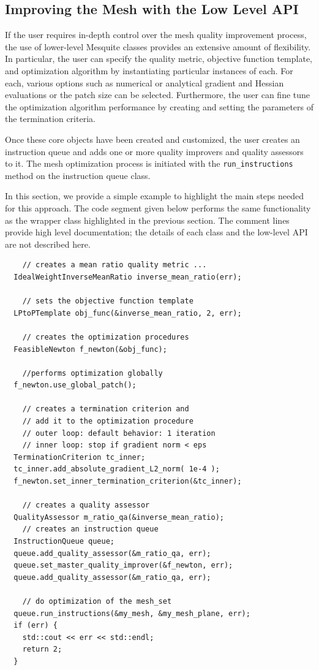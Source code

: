 \subsection{Improving the Mesh with the Low Level API}
\label{sec:tutDetailedAPI}
If the user requires in-depth control over the mesh quality improvement
process, the use of lower-level Mesquite classes provides an extensive
amount of flexibility.   In particular, the user can specify the quality
metric, objective function template, and optimization algorithm by
instantiating particular instances of each.  For each, various options
such as numerical or analytical gradient and Hessian evaluations or
the patch size can be selected.  Furthermore, the user can fine tune
the optimization algorithm performance by creating and setting the parameters 
of the termination criteria.

Once these core objects have been created and customized, the user
creates an instruction queue and adds one or more quality improvers
and quality assessors to it.  The mesh optimization process is initiated
with the {\tt run\_instructions} method on the instruction queue
class.

In this section, we provide a simple example to highlight the main
steps needed for this approach.  The code segment given below performs
the same functionality as the wrapper class highlighted in the
previous section.  The comment lines provide high level documentation;
the details of each class and the low-level API are not described here.

\begin{verbatim}
    // creates a mean ratio quality metric ...
  IdealWeightInverseMeanRatio inverse_mean_ratio(err);

    // sets the objective function template
  LPtoPTemplate obj_func(&inverse_mean_ratio, 2, err);
  
    // creates the optimization procedures
  FeasibleNewton f_newton(&obj_func);

    //performs optimization globally
  f_newton.use_global_patch(); 

    // creates a termination criterion and 
    // add it to the optimization procedure
    // outer loop: default behavior: 1 iteration
    // inner loop: stop if gradient norm < eps
  TerminationCriterion tc_inner;
  tc_inner.add_absolute_gradient_L2_norm( 1e-4 ); 
  f_newton.set_inner_termination_criterion(&tc_inner);

    // creates a quality assessor
  QualityAssessor m_ratio_qa(&inverse_mean_ratio);
    // creates an instruction queue
  InstructionQueue queue;
  queue.add_quality_assessor(&m_ratio_qa, err); 
  queue.set_master_quality_improver(&f_newton, err); 
  queue.add_quality_assessor(&m_ratio_qa, err); 

    // do optimization of the mesh_set
  queue.run_instructions(&my_mesh, &my_mesh_plane, err); 
  if (err) {
    std::cout << err << std::endl;
    return 2;
  }
\end{verbatim} 

